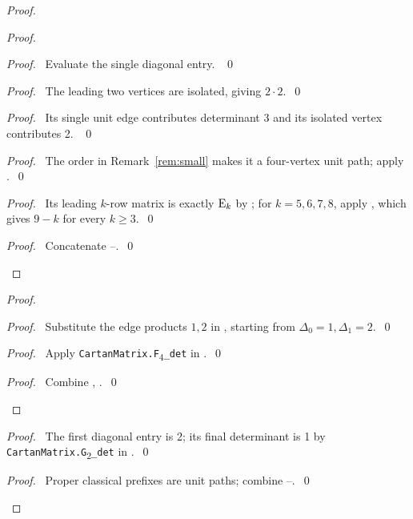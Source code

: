 \begin{proof}
\begin{proof}
\begin{proof}\pf\ Evaluate the single diagonal entry. ~\qed\end{proof}
\begin{proof}\pf\ The leading two vertices are isolated, giving $2\cdot2$.~\qed\end{proof}
\begin{proof}\pf\ Its single unit edge contributes determinant 3 and
its isolated vertex contributes 2. ~\qed\end{proof}
\begin{proof}\pf\ The order in Remark~\ref{rem:small} makes it a
four-vertex unit path; apply .~\qed\end{proof}
\begin{proof}\pf\ Its leading $k$-row matrix is exactly
$\mathrm{E}_k$ by ; for $k=5,6,7,8$, apply
, which gives $9-k$ for every $k\geq3$.~\qed\end{proof}
\qedstep
\begin{proof}\pf\ Concatenate --.~\qed\end{proof}
\end{proof}
\begin{proof}
\begin{proof}\pf\ Substitute the edge products $1,2$ in
, starting from $\Delta_0=1,\Delta_1=2$.~\qed\end{proof}
\begin{proof}\pf\ Apply \texttt{CartanMatrix.F}\textsubscript{4}\texttt{\_det} in
.~\qed\end{proof}
\qedstep
\begin{proof}\pf\ Combine , .~\qed\end{proof}
\end{proof}
\begin{proof}\pf\ The first diagonal entry is 2; its final
determinant is 1 by \texttt{CartanMatrix.G}\textsubscript{2}\texttt{\_det} in
.~\qed\end{proof}
\qedstep
\begin{proof}\pf\ Proper classical prefixes are unit paths; combine
--.~\qed\end{proof}
\end{proof}

